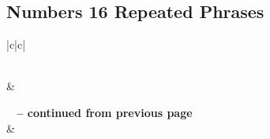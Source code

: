 \subsection{Numbers 16 Repeated Phrases}


\normalsize
 
\begin{center}
\begin{longtable}{|c|c|}
\caption[Numbers 16 Repeated Phrases]{Numbers 16 Repeated Phrases}\label{table:Repeated Phrases Numbers 16} \\
\hline {} &  \\ \hline 
\endfirsthead
 
{{\bfseries \tablename\ \thetable{} -- continued from previous page}} \\  
\hline {} &  \\ \hline 
\endhead
 

\end{longtable}
\end{center}
